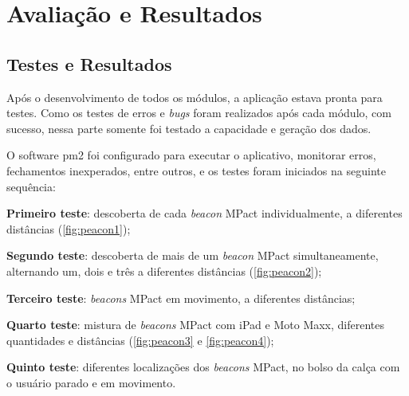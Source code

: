 
\chapter{Avaliação e Resultados}\label{sec:testes-resultados}

\section{Testes e Resultados}\label{sec:testes-resultados}

Após o desenvolvimento de todos os módulos, a aplicação estava pronta para testes. Como os testes de erros e \textit{bugs} foram realizados após cada módulo, com sucesso, nessa parte somente foi testado a capacidade e geração dos dados.

O software pm2 foi configurado para executar o aplicativo, monitorar erros, fechamentos inexperados, entre outros, e os testes foram iniciados na seguinte sequência:

\begin{alineas}
	\item \textbf{Primeiro teste}: descoberta de cada \textit{beacon} MPact individualmente, a diferentes distâncias (\autoref{fig:peacon1});
	\item \textbf{Segundo teste}: descoberta de mais de um \textit{beacon} MPact simultaneamente, alternando um, dois e três a diferentes distâncias (\autoref{fig:peacon2});
	\item \textbf{Terceiro teste}: \textit{beacons} MPact em movimento, a diferentes distâncias;
	\item \textbf{Quarto teste}: mistura de \textit{beacons} MPact com iPad e Moto Maxx, diferentes quantidades e distâncias (\autoref{fig:peacon3} e \autoref{fig:peacon4});
	\item \textbf{Quinto teste}: diferentes localizações dos \textit{beacons} MPact, no bolso da calça com o usuário parado e em movimento.
\end{alineas}

